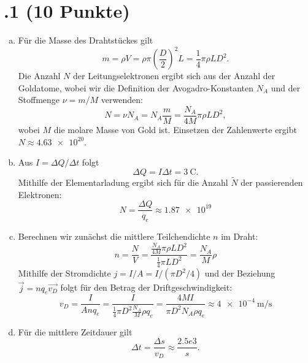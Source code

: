 \section*{\nr.1 \titone (10 Punkte)}
\begin{enumerate}[(a)]
\item Für die Masse des Drahtstückes gilt
\begin{equation}
m = \rho V = \rho \pi \left(\frac{D}{2} \right)^2 L = \frac{1}{4}\pi \rho L D^2.
\end{equation}
Die Anzahl $N$ der Leitungselektronen ergibt sich aus der Anzahl der Goldatome, wobei wir die Definition der Avogadro-Konstanten $N_A$ und der Stoffmenge $\nu=m/M$ verwenden:
\begin{equation}
N =\nu N_A  = N_A \frac{m}{M} = \frac{N_A}{4M} \pi \rho L D^2,
\end{equation}
wobei $M$ die molare Masse von Gold ist. Einsetzen der Zahlenwerte ergibt $N \approx \num{4.63e20}$.

\item Aus $I=\Delta Q / \Delta t$ folgt
\begin{equation}
\Delta Q = I \Delta t = \SI{3}{\coulomb}.
\end{equation}
Mithilfe der Elementarladung ergibt sich für die Anzahl $\tilde{N}$ der passierenden Elektronen:
\begin{equation}
N = \frac{\Delta Q}{q_e}  \approx  \num{1.87e19}
\end{equation}

\item Berechnen wir zunächst die mittlere Teilchendichte $n$ im Draht:
\begin{equation}
n = \frac{N}{V} = \frac{\frac{N_A}{4M} \pi \rho L D^2}{\frac{1}{4}\pi L D^2} = \frac{N_A}{M} \rho
\end{equation}
Mithilfe der Stromdichte $j=I/A=I/(\pi D^2/4)$ und der Beziehung $\vec{j} = nq_e \vec{v_D}$ folgt für den Betrag der Driftgeschwindigkeit:
\begin{equation}
v_D = \frac{I}{Anq_e} = \frac{I}{\frac{1}{4}\pi D^2 \frac{N_A}{M} \rho q_e} = \frac{4MI}{\pi D^2 N_A \rho q_e} \approx \SI{4e-4}{\meter\per\second}
\end{equation}

\item Für die mittlere Zeitdauer gilt
\begin{equation}
\Delta t = \frac{\Delta s}{v_D} \approx \frac{2.5e3}{s}.
\end{equation}

\end{enumerate}